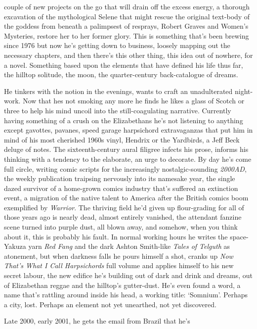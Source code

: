 \documentclass[
]{article}
\begin{document}
couple of new projects on the go that will drain off the excess energy,
a thorough excavation of the mythological Selene that might rescue the
original text-body of the goddess from beneath a palimpsest of resprays,
Robert Graves and Women's Mysteries, restore her to her former glory.
This is something that's been brewing since 1976 but now he's getting
down to business, loosely mapping out the necessary chapters, and then
there's this other thing, this idea out of nowhere, for a novel.
Something based upon the elements that have defined his life thus far,
the hilltop solitude, the moon, the quarter-century back-catalogue of
dreams. \par
He tinkers with the notion in the evenings, wants to craft an
unadulterated night-work. Now that hes not smoking any more he finds he
likes a glass of Scotch or three to help his mind uncoil into the
still-coagulating narrative. Currently having something of a crush on
the Elizabethans he's not listening to anything except gavottes,
pavanes, speed garage harpsichord extravaganzas that put him in mind of
his most cherished 1960s vinyl, Hendrix or the Yardbirds, a Jeff Beck
deluge of notes. The sixteenth-century aural filigree infects his prose,
informs his thinking with a tendency to the elaborate, an urge to
decorate. By day he's come full circle, writing comic scripts for the
increasingly nostalgic-sounding \emph{2000AD}, the weekly publication
traipsing nervously into its namesake year, the single dazed survivor of
a home-grown comics industry that's suffered an extinction event, a
migration of the native talent to America after the British comics boom
exemplified by \emph{Warrior}. The thriving field he'd given up
flour-grading for all of those years ago is nearly dead, almost entirely
vanished, the attendant fanzine scene turned into purple dust, all blown
away, and somehow, when you think about it, this is probably his fault.
In normal working hours he writes the space-Yakuza yarn \emph{Red Fang}
and the dark Ashton Smith-like \emph{Tales of Telguth} as atonement, but
when darkness falls he pours himself a shot, cranks up \emph{Now That's
What I Call Harpsichords} full volume and applies himself to his new
secret labour, the new edifice he's building out of dark and drink and
dreams, out of Elizabethan reggae and the hilltop's gutter-dust. He's
even found a word, a name that's rattling around inside his head, a
working title: `Somnium'. Perhaps a city, lost. Perhaps an element not
yet unearthed, not yet discovered. \par
Late 2000, early 2001, he gets the email from Brazil that he's
\end{document}
